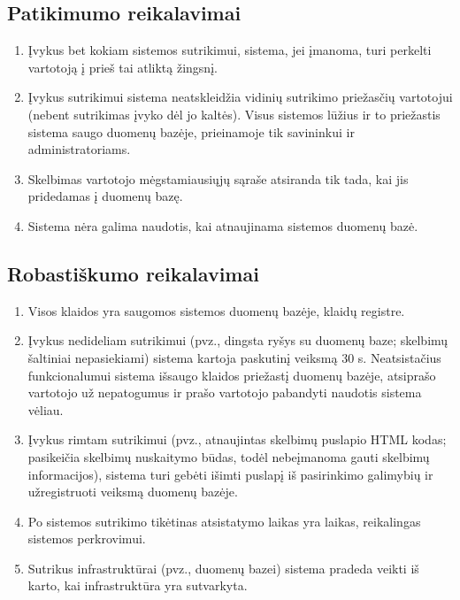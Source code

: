 \documentclass[12pt]{article}
\begin{document}
	\subsection{Patikimumo reikalavimai}
	\begin{enumerate}[labelindent=10pt,leftmargin=2.2cm]
		\item Įvykus bet kokiam sistemos sutrikimui, sistema, jei įmanoma, turi perkelti vartotoją į prieš tai atliktą žingsnį.
		\item Įvykus sutrikimui sistema neatskleidžia vidinių sutrikimo priežasčių vartotojui (nebent sutrikimas įvyko dėl jo kaltės). Visus sistemos lūžius ir to priežastis sistema saugo duomenų bazėje, prieinamoje tik savininkui ir administratoriams.
		\item Skelbimas vartotojo mėgstamiausiųjų sąraše atsiranda tik tada, kai jis pridedamas į duomenų bazę.
		\item Sistema nėra galima naudotis, kai atnaujinama sistemos duomenų bazė.
	\end{enumerate}	
	
	\subsection{Robastiškumo reikalavimai}
	\begin{enumerate}[labelindent=10pt,leftmargin=2.2cm]
		\item Visos klaidos yra saugomos sistemos duomenų bazėje, klaidų registre.
		\item Įvykus nedideliam sutrikimui (pvz., dingsta ryšys su duomenų baze; skelbimų šaltiniai nepasiekiami) sistema kartoja paskutinį veiksmą 30 s. Neatsistačius funkcionalumui sistema išsaugo klaidos priežastį duomenų bazėje, atsiprašo vartotojo už nepatogumus ir prašo vartotojo pabandyti naudotis sistema vėliau.
		\item Įvykus rimtam sutrikimui (pvz., atnaujintas skelbimų puslapio HTML kodas; pasikeičia skelbimų nuskaitymo būdas, todėl nebeįmanoma gauti skelbimų informacijos), sistema turi gebėti išimti puslapį iš pasirinkimo galimybių ir užregistruoti veiksmą duomenų bazėje.
		\item Po sistemos sutrikimo tikėtinas atsistatymo laikas yra laikas, reikalingas sistemos perkrovimui.
		\item Sutrikus infrastruktūrai (pvz., duomenų bazei) sistema pradeda veikti iš karto, kai infrastruktūra yra sutvarkyta.
	\end{enumerate}	
	
\end{document}
